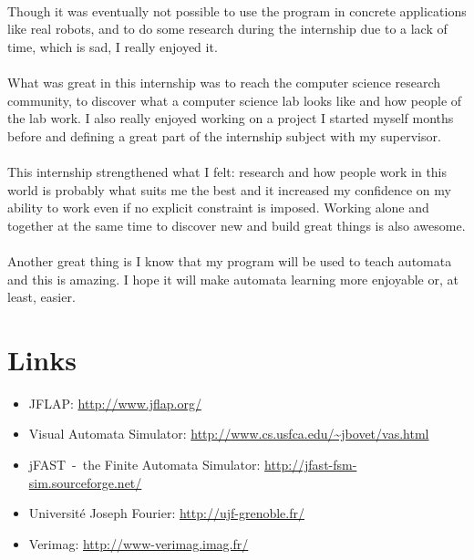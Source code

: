 \documentclass{article}
\begin{document}
\begin{sloppypar}
\paragraph{}
Though it was eventually not possible to use the program in concrete applications like real robots, and to do some research during the internship due to a lack of time, which is sad, I really enjoyed it.

   
\paragraph{}
What was great in this internship was to reach the computer science research community, to discover what a computer science lab looks like and how people of the lab work. I also really enjoyed working on a project I started myself months before and defining a great part of the internship subject with my supervisor.

   
\paragraph{}
This internship strengthened what I felt: research and how people work in this world is probably what suits me the best and it increased my confidence on my ability to work even if no explicit constraint is imposed. Working alone and together at the same time to discover new and build great things is also awesome.

   
\paragraph{}
Another great thing is I know that my program will be used to teach automata and this is amazing. I hope it will make automata learning more enjoyable or, at least, easier.




\section{ Links}


\begin{itemize}
	\item{ JFLAP: \href{http://www.jflap.org/}{http://www.jflap.org/}}
	\item{ Visual Automata Simulator: \href{http://www.cs.usfca.edu/%5Ctextasciitilde%20jbovet/vas.html}{http://www.cs.usfca.edu/\textasciitilde jbovet/vas.html}}
	\item{ jFAST - the Finite Automata Simulator: \href{http://jfast-fsm-sim.sourceforge.net/}{http://jfast-fsm-sim.sourceforge.net/}}
	\item{ Université Joseph Fourier: \href{http://ujf-grenoble.fr/}{http://ujf-grenoble.fr/}}
	\item{ Verimag: \href{http://www-verimag.imag.fr/}{http://www-verimag.imag.fr/}}
\end{itemize}
\end{sloppypar}
\end{document}
